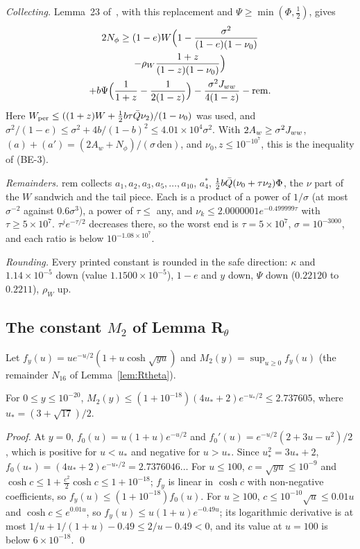 \emph{Collecting.} Lemma~23 of~\cite{F}, with this replacement and $\Psi\ge\min(\Phi,\frac12)$, gives
\begin{multline}
2N_\phi\ge(1-e)W\Bigl(1-\frac{\sigma^2}{(1-e)(1-\nu_0)}\\
-\rho_W\frac{1+z}{(1-z)(1-\nu_0)}\Bigr)\\
+b\Psi\Bigl(\frac1{1+z}-\frac1{2(1-z)}\Bigr)-\frac{\sigma^2J_{ww}}{4(1-z)}-\mathrm{rem}.
\end{multline}
Here $W_{\rm per}\le((1+z)W+\frac12b\tau\bar Q\nu_2)/(1-\nu_0)$ was used, and $\sigma^2/(1-e)\le\sigma^2+4b/(1-b)^2\le4.01\times10^4\sigma^2$.
With $2A_w\ge\sigma^2J_{ww}$, $(a)+(a')=(2A_w+N_\phi)/(\sigma\,\mathrm{den})$, and $\nu_0,z\le10^{-10^7}$, this is the inequality of (BE-3).

\emph{Remainders.} rem collects $a_1,a_2,a_3,a_5,\dots,a_{10}$, $a_4^*$, $\frac12b\bar Q(\nu_0+\tau\nu_2)\Phi$, the $\nu$ part of the $W$ sandwich and the tail piece.
Each is a product of a power of $1/\sigma$ (at most $\sigma^{-2}$ against $0.6\sigma^3$), a power of $\tau\le$ any, and $\nu_k\le2.0000001e^{-0.499999\tau}$ with $\tau\ge5\times10^7$.
$\tau^je^{-\tau/2}$ decreases there, so the worst end is $\tau=5\times10^7$, $\sigma=10^{-3000}$, and each ratio is below $10^{-1.08\times10^7}$.

\emph{Rounding.} Every printed constant is rounded in the safe direction: $\kappa$ and $1.14\times10^{-5}$ down (value $1.1500\times10^{-5}$), $1-e$ and $y$ down, $\Psi$ down ($0.22120$ to $0.2211$), $\rho_W$ up.

\subsection{The constant \texorpdfstring{$M_2$}{M2} of Lemma R\texorpdfstring{$_\theta$}{theta}}
\label{app:details:M2}
Let $f_y(u)=ue^{-u/2}(1+u\cosh\sqrt{yu})$ and $M_2(y)=\sup_{u\ge0}f_y(u)$ (the remainder $N_{16}$ of Lemma~\ref{lem:Rtheta}).
\begin{lemma} \proofst
For $0\le y\le10^{-20}$, $M_2(y)\le(1+10^{-18})(4u_*+2)e^{-u_*/2}\le2.737605$, where $u_*=(3+\sqrt{17})/2$.
\end{lemma}
\emph{Proof.}
At $y=0$, $f_0(u)=u(1+u)e^{-u/2}$ and $f_0'(u)=e^{-u/2}(2+3u-u^2)/2$, which is positive for $u<u_*$ and negative for $u>u_*$.
Since $u_*^2=3u_*+2$, $f_0(u_*)=(4u_*+2)e^{-u_*/2}=2.7376046\ldots$
For $u\le100$, $c=\sqrt{yu}\le10^{-9}$ and $\cosh c\le1+\frac{c^2}2\cosh c\le1+10^{-18}$; $f_y$ is linear in $\cosh c$ with non-negative coefficients, so $f_y(u)\le(1+10^{-18})f_0(u)$.
For $u\ge100$, $c\le10^{-10}\sqrt u\le0.01u$ and $\cosh c\le e^{0.01u}$, so $f_y(u)\le u(1+u)e^{-0.49u}$; its logarithmic derivative is at most $1/u+1/(1+u)-0.49\le2/u-0.49<0$, and its value at $u=100$ is below $6\times10^{-18}$. \qed

